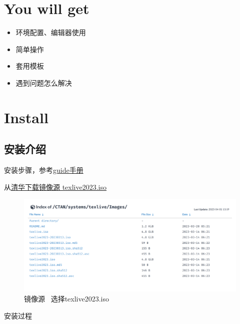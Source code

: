 \documentclass[11pt]{ctexart}
\begin{document}
	
\section{You will get}

\begin{itemize}
	\item 环境配置、编辑器使用
	\item 简单操作
	\item 套用模板
	\item  遇到问题怎么解决
\end{itemize}

\newpage

\section{Install}

\subsection{安装介绍}

安装步骤，参考\href{https://github.com/OsbertWang/install-latex-guide-zh-cn/releases}{guide手册}

从\href{https://mirrors.tuna.tsinghua.edu.cn/CTAN/systems/texlive/Images/}{清华下载镜像源 texlive2023.iso}

\begin{figure}[ht]
	\centering
	\includegraphics[width=1.0\textwidth]{images/texlive2023Images.png}
	\caption{镜像源~ 选择texlive2023.iso}
	\label{fig:2023image}
\end{figure}

安装过程
\end{document}
